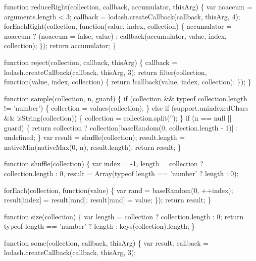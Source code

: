 \begin{DoxyCodeInclude}
    \textcolor{keyword}{function} reduceRight(collection, callback, accumulator, thisArg) \{
      var noaccum = arguments.length < 3;
      callback = lodash.createCallback(callback, thisArg, 4);
      forEachRight(collection, \textcolor{keyword}{function}(value, index, collection) \{
        accumulator = noaccum
          ? (noaccum = \textcolor{keyword}{false}, value)
          : callback(accumulator, value, index, collection);
      \});
      \textcolor{keywordflow}{return} accumulator;
    \}

    \textcolor{keyword}{function} reject(collection, callback, thisArg) \{
      callback = lodash.createCallback(callback, thisArg, 3);
      \textcolor{keywordflow}{return} filter(collection, \textcolor{keyword}{function}(value, index, collection) \{
        \textcolor{keywordflow}{return} !callback(value, index, collection);
      \});
    \}

    \textcolor{keyword}{function} sample(collection, n, guard) \{
      \textcolor{keywordflow}{if} (collection && typeof collection.length != \textcolor{stringliteral}{'number'}) \{
        collection = values(collection);
      \} \textcolor{keywordflow}{else} \textcolor{keywordflow}{if} (support.unindexedChars && isString(collection)) \{
        collection = collection.split(\textcolor{stringliteral}{''});
      \}
      \textcolor{keywordflow}{if} (n == null || guard) \{
        \textcolor{keywordflow}{return} collection ? collection[baseRandom(0, collection.length - 1)] : undefined;
      \}
      var result = shuffle(collection);
      result.length = nativeMin(nativeMax(0, n), result.length);
      \textcolor{keywordflow}{return} result;
    \}

    \textcolor{keyword}{function} shuffle(collection) \{
      var index = -1,
          length = collection ? collection.length : 0,
          result = Array(typeof length == \textcolor{stringliteral}{'number'} ? length : 0);

      forEach(collection, \textcolor{keyword}{function}(value) \{
        var rand = baseRandom(0, ++index);
        result[index] = result[rand];
        result[rand] = value;
      \});
      \textcolor{keywordflow}{return} result;
    \}

    \textcolor{keyword}{function} size(collection) \{
      var length = collection ? collection.length : 0;
      \textcolor{keywordflow}{return} typeof length == \textcolor{stringliteral}{'number'} ? length : keys(collection).length;
    \}

    \textcolor{keyword}{function} some(collection, callback, thisArg) \{
      var result;
      callback = lodash.createCallback(callback, thisArg, 3);


\end{DoxyCodeInclude}
